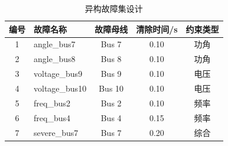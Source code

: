 \begin{table}[htbp]
\centering
\caption{异构故障集设计}
\label{tab:fault_set}
\begin{tabular}{clccc}
\toprule
编号 & 故障名称 & 故障母线 & 清除时间/s & 约束类型 \\
\midrule
1 & angle\_bus7 & Bus 7 & 0.10 & 功角 \\
2 & angle\_bus8 & Bus 8 & 0.10 & 功角 \\
3 & voltage\_bus9 & Bus 9 & 0.10 & 电压 \\
4 & voltage\_bus10 & Bus 10 & 0.10 & 电压 \\
5 & freq\_bus2 & Bus 2 & 0.10 & 频率 \\
6 & freq\_bus4 & Bus 4 & 0.15 & 频率 \\
7 & severe\_bus7 & Bus 7 & 0.20 & 综合 \\
\bottomrule
\end{tabular}
\end{table}
